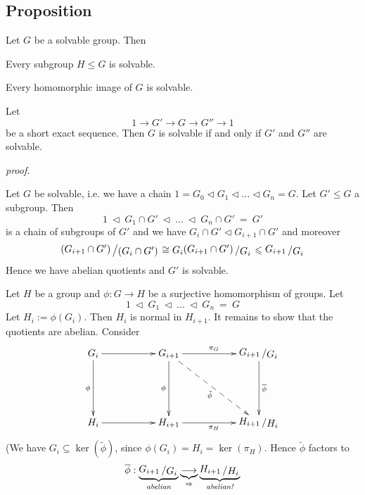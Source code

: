 \documentclass[12pt]{book}
\newcommand{\slant}[2]{{\raisebox{.1em}{$#1$}\left/\raisebox{-.1em}{$#2$}\right.}}
\begin{document}
\begin{spacing}{1.3}
\subsection{Proposition} %
\begin{compactenum}
\item Let $G$ be a solvable group. Then
\begin{compactenum}
\item Every subgroup $H \leqslant G$ is solvable.
\item Every homomorphic image of $G$ is solvable.
\end{compactenum}
\item Let $$1 \longrightarrow G' \longrightarrow G \longrightarrow G'' \longrightarrow 1$$be a short exact sequence. Then $G$ is solvable if and only if $G'$ and $G''$ are solvable.
\end{compactenum}
\textit{proof.}
\begin{compactenum}
\item \begin{compactenum}
\item Let $G$ be solvable, i.e. we have a chain $1=G_0 \triangleleft G_1 \triangleleft \dots \triangleleft G_n=G$. Let $G' \leqslant  G$ a subgroup. Then $$1 \ \triangleleft \ G_1 \cap G' \ \triangleleft \ \dots\ \triangleleft \ G_n \cap G' \ = \ G'$$ is a chain of subgroups of $G'$ and we have $G_i \cap G' \triangleleft G_{i+1} \cap G'$ and moreover $$\slant{\left(G_{i+1} \cap G'\right)}{\left(G_{i} \cap G'\right)} \cong G_i \slant{\left(G_{i+1} \cap G'\right)}{G_i} \leqslant \slant{G_{i+1}}{G_i}$$
Hence we have abelian quotients and $G'$ is solvable.
\item Let $H$ be a group and $\phi: G \longrightarrow H$ be a surjective homomorphism of groups. Let $$1 \ \triangleleft \ G_1 \ \triangleleft \ \dots\ \triangleleft \ G_n\ =\ G$$ Let $H_i:=\phi(G_i)$. Then $H_i$ is normal in $H_{i+1}$. It remains to show that the quotients are abelian. Consider
$$\begin{xy}
\xymatrix{
G_i \ar[dd]_{\phi} \ar[rr] && G_{i+1} \ar[dd]_{\phi} \ar[rr]^{\pi_G} \ar@{-->}[rrdd]_{\tilde{\phi}} && \slant{G_{i+1}}{G_i} \ar[dd]^{\overline{\phi}} \\ &&&& \\
H_i \ar[rr] && H_{i+1} \ar[rr]_{\pi_H} && \slant{H_{i+1}}{H_i}
}
\end{xy}$$
(We have $G_i \subseteq \ker(\tilde{\phi})$, since $\phi(G_i)=H_i=\ker(\pi_H)$.
Hence $\tilde{\phi}$ factors to $$\overline{\phi}: \underbrace{\slant{G_{i+1}}{G_i}}_{\textit{abelian}} \underbrace{\longrightarrow}_{\Rightarrow} \underbrace{\slant{H_{i+1}}{H_i}}_{\textit{abelian!}}$$

\end{compactenum}
\end{compactenum}
\end{spacing}
\end{document}

